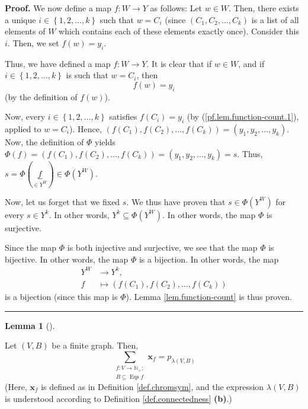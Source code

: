\documentclass[numbers=enddot,12pt,final,onecolumn,notitlepage]{scrartcl}%
\theoremstyle{definition}
\newtheorem{lem}[theo]{Lemma}
\newenvironment{lemma}[1][]
{\begin{lem}[#1]\begin{leftbar}}
{\end{leftbar}\end{lem}}
\newenvironment{proof}[1][Proof]{\noindent\textbf{#1.} }{\ \rule{0.5em}{0.5em}}
\newenvironment{verlong}{}{}
\let\sumnonlimits\sum
\renewcommand{\sum}{\sumnonlimits\limits}
\begin{document}
\begin{verlong}
\begin{proof}
We now define a map $f:W\rightarrow Y$ as follows: Let $w\in W$. Then, there
exists a unique $i\in\left\{  1,2,\ldots,k\right\}  $ such that $w=C_{i}$
(since $\left(  C_{1},C_{2},\ldots,C_{k}\right)  $ is a list of all elements
of $W$ which contains each of these elements exactly once). Consider this $i$.
Then, we set $f\left(  w\right)  =y_{i}$.

Thus, we have defined a map $f:W\rightarrow Y$. It is clear that if $w\in W$,
and if $i\in\left\{  1,2,\ldots,k\right\}  $ is such that $w=C_{i}$, then%
\begin{equation}
f\left(  w\right)  =y_{i} \label{pf.lem.function-count.1}%
\end{equation}
(by the definition of $f\left(  w\right)  $).

Now, every $i\in\left\{  1,2,\ldots,k\right\}  $ satisfies $f\left(
C_{i}\right)  =y_{i}$ (by (\ref{pf.lem.function-count.1}), applied to
$w=C_{i}$). Hence, $\left(  f\left(  C_{1}\right)  ,f\left(  C_{2}\right)
,\ldots,f\left(  C_{k}\right)  \right)  =\left(  y_{1},y_{2},\ldots
,y_{k}\right)  $. Now, the definition of $\Phi$ yields $\Phi\left(  f\right)
=\left(  f\left(  C_{1}\right)  ,f\left(  C_{2}\right)  ,\ldots,f\left(
C_{k}\right)  \right)  =\left(  y_{1},y_{2},\ldots,y_{k}\right)  =s$. Thus,
$s=\Phi\left(  \underbrace{f}_{\in Y^{W}}\right)  \in\Phi\left(  Y^{W}\right)
$.

Now, let us forget that we fixed $s$. We thus have proven that $s\in
\Phi\left(  Y^{W}\right)  $ for every $s\in Y^{k}$. In other words,
$Y^{k}\subseteq\Phi\left(  Y^{W}\right)  $. In other words, the map $\Phi$ is surjective.

Since the map $\Phi$ is both injective and surjective, we see that the map
$\Phi$ is bijective. In other words, the map $\Phi$ is a bijection. In other
words, the map
\begin{align*}
Y^{W}  &  \rightarrow Y^{k},\\
f  &  \mapsto\left(  f\left(  C_{1}\right)  ,f\left(  C_{2}\right)
,\ldots,f\left(  C_{k}\right)  \right)
\end{align*}
is a bijection (since this map is $\Phi$). Lemma \ref{lem.function-count} is
thus proven.
\end{proof}
\end{verlong}

\begin{lemma}
\label{lem.Eqs.sum}Let $\left(  V,B\right)  $ be a finite graph. Then,%
\[
\sum_{\substack{f:V\rightarrow\mathbb{N}_{+};\\B\subseteq\operatorname*{Eqs}%
f}}\mathbf{x}_{f}=p_{\lambda\left(  V,B\right)  }%
\]
(Here, $\mathbf{x}_{f}$ is defined as in Definition \ref{def.chromsym}, and
the expression $\lambda\left(  V,B\right)  $ is understood according to
Definition \ref{def.connectedness} \textbf{(b)}.)
\end{lemma}
\end{document}
